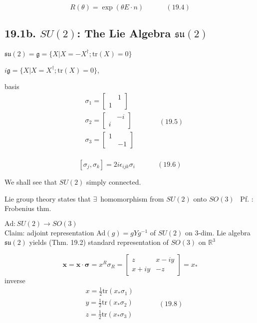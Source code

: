\begin{equation}
R(\theta) = \exp{ (\theta E\cdot n ) } \quad \quad \quad \, (19.4)
\end{equation}



\subsection{19.1b. $SU(2)$: The Lie Algebra $\mathfrak{su}(2)$}

$\mathfrak{su}(2) = \mathfrak{g} = \lbrace X | X = - X^{\dag}; \text{tr}{(X)} = 0\rbrace$

$i\mathfrak{g} = \lbrace X | X = X^{\dag}; \text{tr}{(X)} = 0 \rbrace$, 

basis 
\[
\begin{aligned}
  & \sigma_1 = \left[ \begin{matrix} & 1 \\ 1 &   \end{matrix} \right] \\
  & \sigma_2 = \left[ \begin{matrix} & -i \\ i &   \end{matrix} \right] \\
  & \sigma_3 = \left[ \begin{matrix} 1 &  \\ & -1  \end{matrix} \right] \\
\end{aligned} \quad \quad \quad \, (19.5)
\]

\[
[ \sigma_j , \sigma_k ] = 2i \epsilon_{ijk} \sigma_i \quad \quad \quad \, (19.6)
\]

We shall see that $SU(2)$ simply connected.

Lie group theory states that $\exists \, $ homomorphism from $SU(2)$ onto $SO(3)$ \quad \, Pf. : Frobenius thm.

$\text{Ad}:SU(2) \to SO(3)$ \\
Claim: adjoint representation $\text{Ad}(g) = gYg^{-1}$ of $SU(2)$ on 3-dim. Lie algebra $\mathfrak{su}(2)$ yields (Thm. 19.2) standard representation of $SO(3)$ on $\mathbb{R}^3$

\[
\mathbf{x} = \mathbf{x} \cdot \mathbf{\sigma} = x^R \sigma_R = \left[ \begin{matrix} z & x - iy \\ x+ iy & - z \end{matrix} \right] = x_*
\]
inverse
\[
\begin{aligned}
  & x = \frac{1}{2} \text{tr}{ ( x_* \sigma_1 ) }  \\
  & y = \frac{1}{2} \text{tr}{ ( x_* \sigma_2 ) }  \\
  & z = \frac{1}{2} \text{tr}{ ( x_* \sigma_3 ) }  \\
\end{aligned} \quad \quad \quad \, (19.8)
\]

